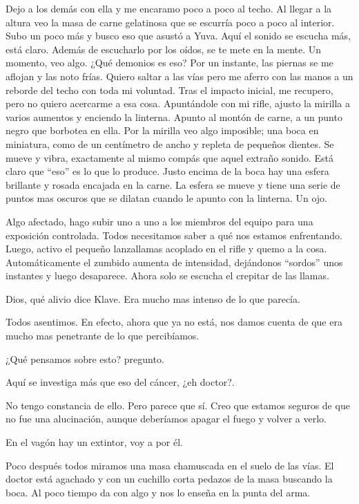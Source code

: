 Dejo a los demás con ella y me encaramo poco a poco al techo. Al llegar a la altura veo la masa de carne gelatinosa que se escurría poco a poco al interior. Subo un poco más y busco eso que asustó a Yuva. Aquí el sonido se escucha más, está claro. Además de escucharlo por los oídos, se te mete en la mente. Un momento, veo algo. ¿Qué demonios es eso? Por un instante, las piernas se me aflojan y las noto frías. Quiero saltar a las vías pero me aferro con las manos a un reborde del techo con toda mi voluntad. Tras el impacto inicial, me recupero, pero no quiero acercarme a esa cosa. Apuntándole con mi rifle, ajusto la mirilla a varios aumentos y enciendo la linterna. Apunto al montón de carne, a un punto negro que borbotea en ella. Por la mirilla veo algo imposible; una boca en miniatura, como de un centímetro de ancho y repleta de pequeños dientes. Se mueve y vibra, exactamente al mismo compás que aquel extraño sonido. Está claro que ``eso'' es lo que lo produce. Justo encima de la boca hay una esfera brillante y rosada encajada en la carne. La esfera se mueve y tiene una serie de puntos mas oscuros que se dilatan cuando le apunto con la linterna. Un ojo.

Algo afectado, hago subir uno a uno a los miembros del equipo para una exposición controlada. Todos necesitamos saber a qué nos estamos enfrentando. Luego, activo el pequeño lanzallamas acoplado en el rifle y quemo a la cosa. Automáticamente el zumbido aumenta de intensidad, dejándonos ``sordos'' unos instantes y luego desaparece. Ahora solo se escucha el crepitar de las llamas.

\reply Dios, qué alivio \pause dice Klave\pauseend. Era mucho mas intenso de lo que parecía.

Todos asentimos. En efecto, ahora que ya no está, nos damos cuenta de que era mucho mas penetrante de lo que percibíamos.

\reply ¿Qué pensamos sobre esto? \pause pregunto.

\reply Aquí se investiga más que eso del cáncer, ¿eh doctor?. \klave

\reply No tengo constancia de ello. Pero parece que sí. Creo que estamos seguros de que no fue una alucinación, aunque deberíamos apagar el fuego y volver a verlo.

\reply En el vagón hay un extintor, voy a por él. \yuva

Poco después todos miramos una masa chamuscada en el suelo de las vías. El doctor está agachado y con un cuchillo corta pedazos de la masa buscando la boca. Al poco tiempo da con algo y nos lo enseña en la punta del arma.


